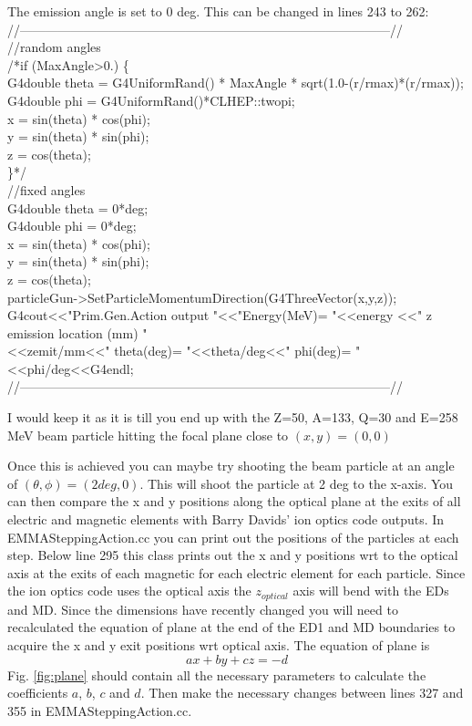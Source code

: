 \documentclass[letter,11pt]{article}
\newcommand{\filefont}[1]{{\scriptsize\ttfamily\selectfont #1}\xspace}
\begin{document}
The emission angle is set to 0 deg. This can be changed in lines 243 to 262:\\
\filefont{//---------------------------------------------------------------------------------------//\\
    //random angles\\
    /*if (MaxAngle>0.) \{\\
      G4double theta = G4UniformRand() * MaxAngle * sqrt(1.0-(r/rmax)*(r/rmax));\\
      G4double phi = G4UniformRand()*CLHEP::twopi;\\
      x = sin(theta) * cos(phi);\\
      y = sin(theta) * sin(phi);\\
      z = cos(theta);\\
    \}*/\\
    //fixed angles\\
    G4double theta = 0*deg;\\
    G4double phi = 0*deg;\\
    x = sin(theta) * cos(phi);\\
    y = sin(theta) * sin(phi);\\
    z = cos(theta);\\
    particleGun->SetParticleMomentumDirection(G4ThreeVector(x,y,z));\\
    
    G4cout<<"Prim.Gen.Action output "<<"Energy(MeV)= "<<energy <<" z emission location (mm) "\\
          <<zemit/mm<<" theta(deg)= "<<theta/deg<<" phi(deg)= "<<phi/deg<<G4endl;\\
//---------------------------------------------------------------------------------------//\\}

I would keep it as it is till you end up with the Z=50, A=133, Q=30 and E=258 MeV beam particle hitting the focal plane close to $(x,y)=(0,0)$

Once this is achieved you can maybe try shooting the beam particle at an angle of $(\theta,\phi)=(2 deg,0)$. This will shoot the particle at 2 deg to the x-axis. You can then compare the x and y positions along the optical plane at the exits of all electric and magnetic elements with Barry Davids' ion optics code outputs. In EMMASteppingAction.cc you can print out the positions of the particles at each step. Below line 295 this class prints out the x and y positions wrt to the optical axis at the exits of each magnetic for each electric element for each particle. Since the ion optics code uses the optical axis the $z_{optical}$ axis will bend with the EDs and MD. Since the dimensions have recently changed you will need to recalculated the equation of plane at the end of the ED1 and MD boundaries to acquire the x and y exit positions wrt optical axis. The equation of plane is
\begin{equation}
ax+by+cz=-d
\end{equation}
Fig. \ref{fig:plane} should contain all the necessary parameters to calculate the coefficients $a$, $b$, $c$ and $d$. Then make the necessary changes between lines 327 and 355 in EMMASteppingAction.cc.
\end{document}
